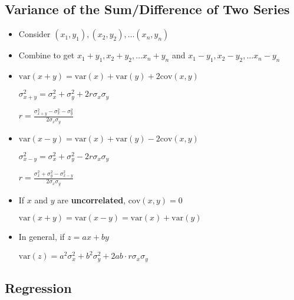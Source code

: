 \subsection*{Variance of the Sum/Difference of Two Series}

\begin{itemize}
    \item Consider $(x_1, y_1), (x_2, y_2), \dots (x_n, y_n)$
    \item Combine to get $x_1 + y_1, x_2 + y_2, \dots x_n + y_n$ and $x_1 - y_1, x_2 - y_2, \dots x_n - y_n$
    \item $\text{var}(x + y) = \text{var}(x) + \text{var}(y) + 2 \text{cov}(x, y)$

    $\sigma_{x + y}^2 = \sigma_x^2 + \sigma_y^2 + 2r \sigma_x \sigma_y$

    $r = \frac{\sigma_{x+y}^2 - \sigma_x^2 - \sigma_y^2}{2 \sigma_x \sigma_y}$
    \item $\text{var}(x - y) = \text{var}(x) + \text{var}(y) - 2 \text{cov}(x, y)$

    $\sigma_{x - y}^2 = \sigma_x^2 + \sigma_y^2 - 2r \sigma_x \sigma_y$

        $r = \frac{\sigma_x^2 + \sigma_y^2 - \sigma_{x-y}^2}{2 \sigma_x \sigma_y}$

    \item If $x$ and $y$ are \textbf{uncorrelated}, $\text{cov}(x, y) = 0$

    $\text{var}(x + y) = \text{var}(x - y) = \text{var}(x) + \text{var}(y)$
    \item In general, if $z = ax + by$

    $\text{var}(z) = a^2 \sigma_x^2 + b^2 \sigma_y^2 + 2ab \cdot r \sigma_x \sigma_y$
        
\end{itemize}

\subsection*{Regression}

